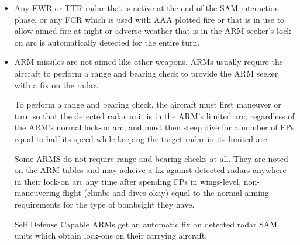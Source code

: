 \begin{itemize}

    \item{} Any EWR or TTR radar that is active at the end of the SAM interaction phase, or any FCR which is used with AAA plotted fire or that is in use to allow aimed fire at night or adverse weather that is in the ARM seeker's lock-on arc is automatically detected for the entire turn. 


    \item{} ARM missiles are not aimed like other weapons. ARMs usually require the aircraft to perform a range and bearing check to provide the ARM seeker with a fix on the radar.

    To perform a range and bearing check, the aircraft must first maneuver or turn so that the detected radar unit is in the ARM’s limited arc, regardless of the ARM's normal lock-on arc, and must then steep dive for a number of FPs equal to half its speed while keeping the target radar in its limited arc.

    Some ARMS do not require range and bearing checks at all. They are noted on the ARM tables and may acheive a fix against detected radars anywhere in their lock-on arc any time after spending FPs in wings-level, non-maneuvering flight (climbs and dives okay) equal to the normal aiming requirements for the type of bombsight they have.
    


    Self Defense Capable ARMs get an automatic fix on detected radar SAM units which obtain lock-ons on their carrying aircraft. 


\end{itemize}

